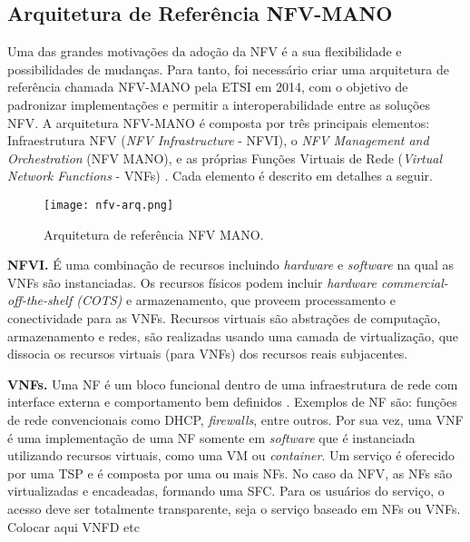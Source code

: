 \subsection{Arquitetura de Referência NFV-MANO}
\label{nfv:arq}
Uma das grandes motivações da adoção da NFV é a sua flexibilidade e possibilidades de mudanças. Para tanto, foi necessário criar uma arquitetura de referência chamada NFV-MANO pela ETSI em 2014, com o objetivo de padronizar implementações e permitir a interoperabilidade entre as soluções NFV. A arquitetura NFV-MANO é composta por três principais elementos: Infraestrutura NFV (\textit{NFV Infrastructure} - NFVI), o \textit{NFV Management and Orchestration} (NFV MANO), e as próprias Funções Virtuais de Rede (\textit{Virtual Network Functions} - VNFs) \citep{nfv_whitepaper}. Cada elemento é descrito em detalhes a seguir.

\begin{figure}[H]
    \centering
    \texttt{[image: nfv-arq.png]}
    \caption{Arquitetura de referência NFV MANO.}
    \label{fig:enter-label}
\end{figure}



\textbf{NFVI.} É uma combinação de recursos incluindo \textit{hardware} e \textit{software} na qual as VNFs são instanciadas. Os recursos físicos podem incluir \textit{hardware commercial-off-the-shelf (COTS)} e armazenamento, que proveem processamento e conectividade para as VNFs. Recursos virtuais são abstrações de computação, armazenamento e redes, são realizadas usando uma camada de virtualização, que dissocia os recursos virtuais (para VNFs) dos recursos reais subjacentes. 

\textbf{VNFs.} Uma NF é um bloco funcional dentro de uma infraestrutura de rede com interface externa e comportamento bem definidos \cite[p.~7]{etsi-nfv003}. Exemplos de NF são: funções de rede convencionais como DHCP, \textit{firewalls}, entre outros. Por sua vez, uma VNF é uma implementação de uma NF somente em \textit{software} que é instanciada utilizando recursos virtuais, como uma VM ou \textit{container}. Um serviço é oferecido por uma TSP e é composta por uma ou mais NFs. No caso da NFV, as NFs são virtualizadas e encadeadas, formando uma SFC. Para os usuários do serviço, o acesso deve ser totalmente transparente, seja o serviço baseado em NFs ou VNFs.
Colocar aqui VNFD etc

